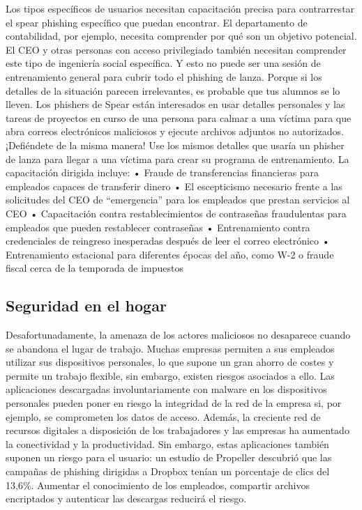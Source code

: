 \documentclass[
]{article}
\begin{document}
Los tipos específicos de usuarios necesitan capacitación precisa para contrarrestar el spear phishing específico que puedan encontrar. El departamento de contabilidad, por ejemplo, necesita comprender por qué son un objetivo potencial. El CEO y otras personas con acceso privilegiado también necesitan comprender este tipo de ingeniería social específica.
Y esto no puede ser una sesión de entrenamiento general para cubrir todo el phishing de lanza. Porque si los detalles de la situación parecen irrelevantes, es probable que tus alumnos se lo lleven. Los phishers de Spear están interesados en usar detalles personales y las tareas de proyectos en curso de una persona para calmar a una víctima para que abra correos electrónicos maliciosos y ejecute archivos adjuntos no autorizados. ¡Defiéndete de la misma manera! Use los mismos detalles que usaría un phisher de lanza para llegar a una víctima para crear su programa de entrenamiento.
La capacitación dirigida incluye:
• Fraude de transferencias financieras para empleados capaces de transferir dinero
• El escepticismo necesario frente a las solicitudes del CEO de ``emergencia'' para los empleados que prestan servicios al CEO
• Capacitación contra restablecimientos de contraseñas fraudulentas para empleados que pueden restablecer contraseñas
• Entrenamiento contra credenciales de reingreso inesperadas después de leer el correo electrónico
• Entrenamiento estacional para diferentes épocas del año, como W-2 o fraude fiscal cerca de la temporada de impuestos

\hypertarget{seguridad-en-el-hogar}{%
\subsection{Seguridad en el hogar}\label{seguridad-en-el-hogar}}

Desafortunadamente, la amenaza de los actores maliciosos no desaparece cuando se abandona el lugar de trabajo. Muchas empresas permiten a sus empleados utilizar sus dispositivos personales, lo que supone un gran ahorro de costes y permite un trabajo flexible, sin embargo, existen riesgos asociados a ello. Las aplicaciones descargadas involuntariamente con malware en los dispositivos personales pueden poner en riesgo la integridad de la red de la empresa si, por ejemplo, se comprometen los datos de acceso.
Además, la creciente red de recursos digitales a disposición de los trabajadores y las empresas ha aumentado la conectividad y la productividad. Sin embargo, estas aplicaciones también suponen un riesgo para el usuario: un estudio de Propeller descubrió que las campañas de phishing dirigidas a Dropbox tenían un porcentaje de clics del 13,6\%. Aumentar el conocimiento de los empleados, compartir archivos encriptados y autenticar las descargas reducirá el riesgo.
\end{document}
